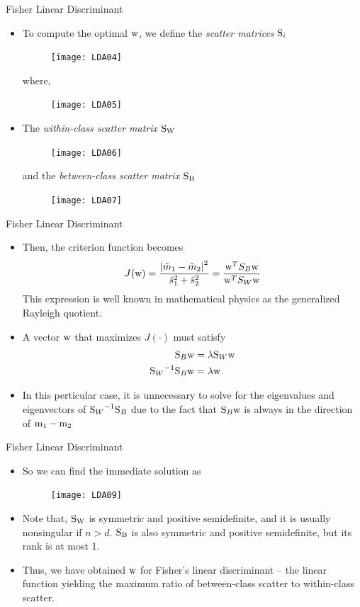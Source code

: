 \begin{frame}{Fisher Linear Discriminant}
\begin{itemize}
\item To compute the optimal ${\rm w}$, we define the \textit{\color{mycolor2}scatter matrices} ${\rm S}_i$
\begin{figure}
\texttt{[image: LDA04]}
\end{figure}
where,
\begin{figure}
\texttt{[image: LDA05]}
\end{figure}
\item The \textit{\color{mycolor2}within-class scatter matrix} ${\rm S_ W}$
\begin{figure}
\texttt{[image: LDA06]}
\end{figure}
and the \textit{\color{mycolor2}between-class scatter matrix} ${\rm S_B}$
\begin{figure}
\texttt{[image: LDA07]}
\end{figure}
\end{itemize}
\end{frame}

\begin{frame}{Fisher Linear Discriminant}
\begin{itemize}
\item Then, the criterion function becomes
\[J({\rm w}) = \frac{{{{\left| {{{\tilde m}_1} - {{\tilde m}_2}} \right|}^2}}}{{\tilde s_1^2 + \tilde s_2^2}} = \frac{{{{\rm w}^T}{S_B}{\rm w}}}{{{{\rm w}^T}{S_W}{\rm w}}}\]
This expression is well known in mathematical physics as the generalized Rayleigh quotient.
\item A vector ${\rm w}$ that maximizes $J(\cdot)$ must satisfy
\begin{align}
{\rm S}_B{\rm w}&=\lambda {\rm S}_W{\rm w} \nonumber\\
{{\rm S}_W}^{-1}{\rm S}_B{\rm w}&=\lambda {\rm w}\nonumber
\end{align}
\item In this perticular case, it is unnecessary to solve for the eigenvalues and eigenvectors of ${{\rm S}_W}^{-1}{\rm S}_B$ due to the fact that ${\rm S}_B{\rm w}$ is always in the direction of ${\rm m}_1-{\rm m}_2$
\end{itemize}
\end{frame}

\begin{frame}{Fisher Linear Discriminant}
\begin{itemize}
\item So we can find the immediate solution as
\begin{figure}
\texttt{[image: LDA09]}
\end{figure}
\item Note that, ${\rm S_W}$ is symmetric and positive semidefinite, and it is usually nonsingular if $n > d$. ${\rm S_B}$ is also symmetric and positive semidefinite, but its rank is at most 1.
\item Thus, we have obtained ${\rm w}$ for Fisher's linear discriminant -- the linear function yielding the maximum ratio of between-class scatter to within-class scatter.
\end{itemize}
\end{frame}

